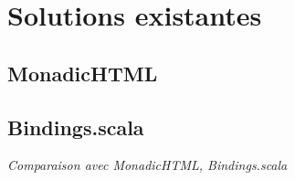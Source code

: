 \section{Solutions existantes}

\subsection{MonadicHTML}
\subsection{Bindings.scala}

\textit{Comparaison avec MonadicHTML, Bindings.scala}